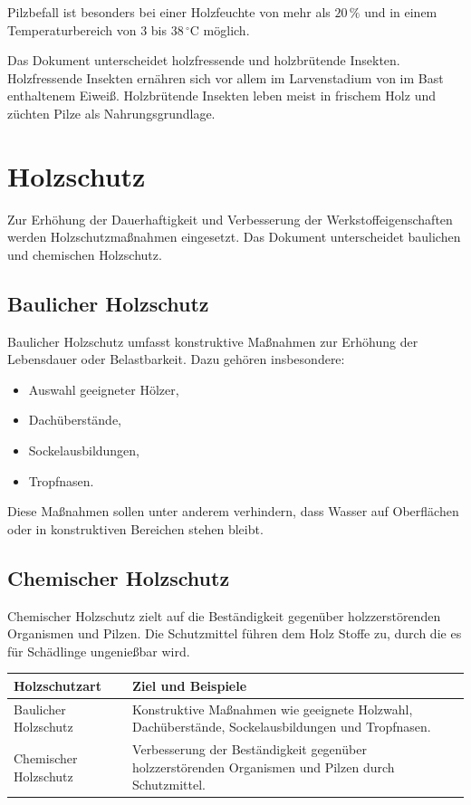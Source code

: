 \documentclass[
  12pt,
  a4paper,
  oneside
]{scrreprt}
\begin{document}
Pilzbefall ist besonders bei einer Holzfeuchte von mehr als
$20\,\%$ und in einem Temperaturbereich von $3$ bis
$38\,^\circ\mathrm{C}$ möglich. 

Das Dokument unterscheidet holzfressende und holzbrütende Insekten.
Holzfressende Insekten ernähren sich vor allem im Larvenstadium von im
Bast enthaltenem Eiweiß. Holzbrütende Insekten leben meist in frischem
Holz und züchten Pilze als Nahrungsgrundlage. 

\section{Holzschutz}

Zur Erhöhung der Dauerhaftigkeit und Verbesserung der
Werkstoffeigenschaften werden Holzschutzmaßnahmen eingesetzt. Das
Dokument unterscheidet baulichen und chemischen Holzschutz.


\subsection{Baulicher Holzschutz}

Baulicher Holzschutz umfasst konstruktive Maßnahmen zur Erhöhung der
Lebensdauer oder Belastbarkeit. Dazu gehören insbesondere:

\begin{itemize}
  \item Auswahl geeigneter Hölzer,
  \item Dachüberstände,
  \item Sockelausbildungen,
  \item Tropfnasen.
\end{itemize}



Diese Maßnahmen sollen unter anderem verhindern, dass Wasser auf
Oberflächen oder in konstruktiven Bereichen stehen bleibt.

\subsection{Chemischer Holzschutz}

Chemischer Holzschutz zielt auf die Beständigkeit gegenüber
holzzerstörenden Organismen und Pilzen. Die Schutzmittel führen dem
Holz Stoffe zu, durch die es für Schädlinge ungenießbar wird.


\begin{longtable}{
  >{\raggedright\arraybackslash}p{}
  >{\raggedright\arraybackslash}p{}
}
\toprule
\textbf{Holzschutzart} &
\textbf{Ziel und Beispiele} \\
\midrule
\endhead

Baulicher Holzschutz &
Konstruktive Maßnahmen wie geeignete Holzwahl, Dachüberstände,
Sockelausbildungen und Tropfnasen. \\

Chemischer Holzschutz &
Verbesserung der Beständigkeit gegenüber holzzerstörenden Organismen
und Pilzen durch Schutzmittel. \\

\bottomrule
\end{longtable}
\end{document}

